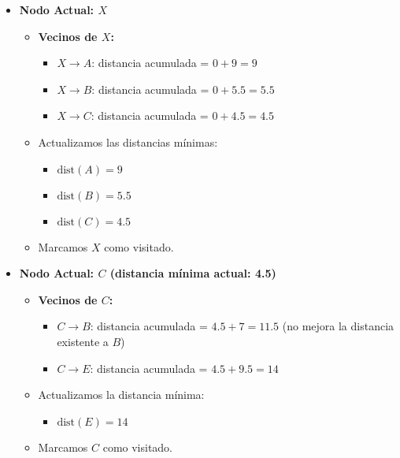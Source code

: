 \documentclass{article}
\begin{document}
\begin{itemize}
    \item \textbf{Nodo Actual: \( X \)}
    \begin{itemize}
        \item \textbf{Vecinos de \( X \):}
        \begin{itemize}
            \item \( X \rightarrow A \): distancia acumulada = \( 0 + 9 = 9 \)
            \item \( X \rightarrow B \): distancia acumulada = \( 0 + 5.5 = 5.5 \)
            \item \( X \rightarrow C \): distancia acumulada = \( 0 + 4.5 = 4.5 \)
        \end{itemize}
        \item Actualizamos las distancias mínimas:
        \begin{itemize}
            \item \( \text{dist}(A) = 9 \)
            \item \( \text{dist}(B) = 5.5 \)
            \item \( \text{dist}(C) = 4.5 \)
        \end{itemize}
        \item Marcamos \( X \) como visitado.
    \end{itemize}

    \item \textbf{Nodo Actual: \( C \) (distancia mínima actual: 4.5)}
    \begin{itemize}
        \item \textbf{Vecinos de \( C \):}
        \begin{itemize}
            \item \( C \rightarrow B \): distancia acumulada = \( 4.5 + 7 = 11.5 \) (no mejora la distancia existente a \( B \))
            \item \( C \rightarrow E \): distancia acumulada = \( 4.5 + 9.5 = 14 \)
        \end{itemize}
        \item Actualizamos la distancia mínima:
        \begin{itemize}
            \item \( \text{dist}(E) = 14 \)
        \end{itemize}
        \item Marcamos \( C \) como visitado.
    \end{itemize}


\end{itemize}
\end{document}
